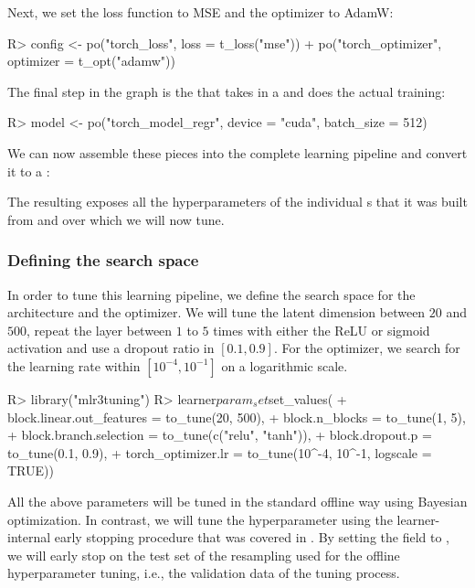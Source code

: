 \documentclass[article]{jss}
\theoremstyle{definition}
\begin{document}
Next, we set the loss function to MSE and the optimizer to AdamW:

\begin{CodeInput}
R> config <- po("torch_loss", loss = t_loss("mse")) %
+    po("torch_optimizer", optimizer = t_opt("adamw"))
\end{CodeInput}

The final step in the graph is the  that takes in a  and does the actual training:

\begin{CodeInput}
R> model <- po("torch_model_regr", device = "cuda", batch_size = 512)
\end{CodeInput}

We can now assemble these pieces into the complete learning pipeline and convert it to a :


The resulting  exposes all the hyperparameters of the individual s that it was built from and over which we will now tune.

\subsubsection{Defining the search space}
In order to tune this learning pipeline, we define the search space for the architecture and the optimizer.
We will tune the latent dimension between $20$ and $500$, repeat the layer between $1$ to $5$ times with either the ReLU or sigmoid activation and use a dropout ratio in $[0.1, 0.9]$.
For the optimizer, we search for the learning rate within $[10^{-4}, 10^{-1}]$ on a logarithmic scale.

\begin{CodeInput}
R> library("mlr3tuning")
R> learner$param_set$set_values(
+    block.linear.out_features = to_tune(20, 500),
+    block.n_blocks = to_tune(1, 5),
+    block.branch.selection = to_tune(c("relu", "tanh")),
+    block.dropout.p = to_tune(0.1, 0.9),
+    torch_optimizer.lr = to_tune(10^-4, 10^-1, logscale = TRUE))
\end{CodeInput}

All the above parameters will be tuned in the standard offline way using Bayesian optimization.
In contrast, we will tune the  hyperparameter using the learner-internal early stopping procedure that was covered in .
By setting the  field to , we will early stop on the test set of the resampling used for the offline hyperparameter tuning, i.e., the validation data of the tuning process.
\end{document}
